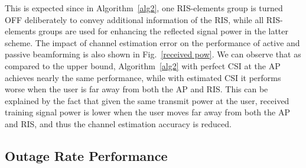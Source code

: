 \documentclass[draftclsnofoot,onecolumn,12pt]{IEEEtran}
\begin{document}
This is expected since in Algorithm~\ref{alg2}, one RIS-elements group is turned OFF deliberately to convey additional information of the RIS, while all RIS-elements groups are used for enhancing the reflected signal power in the latter scheme. 
The impact of channel estimation error on the performance of active and passive beamforming is also shown in Fig.~\ref{received pow}. 
We can observe that as compared to the upper bound, Algorithm~\ref{alg2} with perfect CSI at the AP achieves nearly the same performance, while with estimated CSI it performs worse when the user is far away from both the AP and RIS.  
This can be explained by the fact that given the same transmit power at the user, received training signal power is lower when the user moves far away from both the AP and RIS, and thus the channel estimation accuracy is reduced. 

\subsection{Outage Rate Performance}
\end{document}
